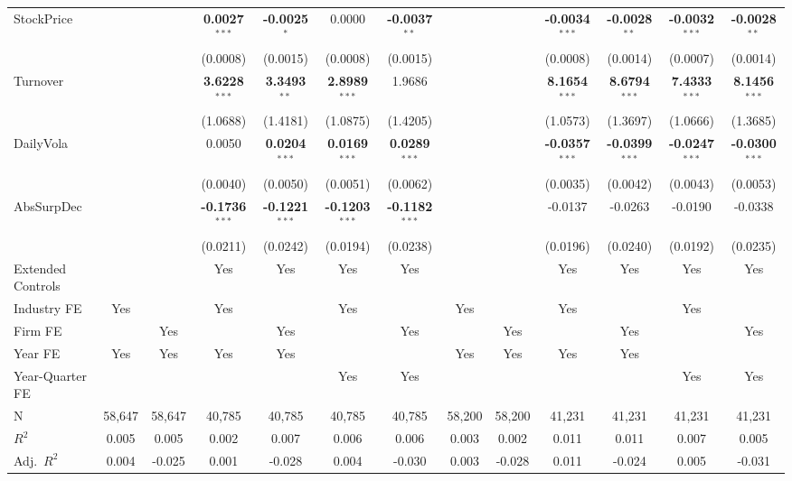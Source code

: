\begin{landscape}
\begin{table}[H]
\begin{tabular}{lcccccccccccc}
StockPrice &  &  & \textbf{0.0027}$^{***}$ & \textbf{-0.0025}$^{*}$ & 0.0000 & \textbf{-0.0037}$^{**}$ &  &  & \textbf{-0.0034}$^{***}$ & \textbf{-0.0028}$^{**}$ & \textbf{-0.0032}$^{***}$ & \textbf{-0.0028}$^{**}$ \\
 &  &  & (0.0008) & (0.0015) & (0.0008) & (0.0015) &  &  & (0.0008) & (0.0014) & (0.0007) & (0.0014) \\
Turnover &  &  & \textbf{3.6228}$^{***}$ & \textbf{3.3493}$^{**}$ & \textbf{2.8989}$^{***}$ & 1.9686 &  &  & \textbf{8.1654}$^{***}$ & \textbf{8.6794}$^{***}$ & \textbf{7.4333}$^{***}$ & \textbf{8.1456}$^{***}$ \\
 &  &  & (1.0688) & (1.4181) & (1.0875) & (1.4205) &  &  & (1.0573) & (1.3697) & (1.0666) & (1.3685) \\
DailyVola &  &  & 0.0050 & \textbf{0.0204}$^{***}$ & \textbf{0.0169}$^{***}$ & \textbf{0.0289}$^{***}$ &  &  & \textbf{-0.0357}$^{***}$ & \textbf{-0.0399}$^{***}$ & \textbf{-0.0247}$^{***}$ & \textbf{-0.0300}$^{***}$ \\
 &  &  & (0.0040) & (0.0050) & (0.0051) & (0.0062) &  &  & (0.0035) & (0.0042) & (0.0043) & (0.0053) \\
AbsSurpDec &  &  & \textbf{-0.1736}$^{***}$ & \textbf{-0.1221}$^{***}$ & \textbf{-0.1203}$^{***}$ & \textbf{-0.1182}$^{***}$ &  &  & -0.0137 & -0.0263 & -0.0190 & -0.0338 \\
 &  &  & (0.0211) & (0.0242) & (0.0194) & (0.0238) &  &  & (0.0196) & (0.0240) & (0.0192) & (0.0235) \\
\midrule
Extended Controls &  &  & Yes & Yes & Yes & Yes &  &  & Yes & Yes & Yes & Yes \\
Industry FE & Yes &  & Yes &  & Yes &  & Yes &  & Yes &  & Yes &  \\
Firm FE &  & Yes &  & Yes &  & Yes &  & Yes &  & Yes &  & Yes \\
Year FE & Yes & Yes & Yes & Yes &  &  & Yes & Yes & Yes & Yes &  &  \\
Year-Quarter FE &  &  &  &  & Yes & Yes &  &  &  &  & Yes & Yes \\
\midrule
N & 58,647 & 58,647 & 40,785 & 40,785 & 40,785 & 40,785 & 58,200 & 58,200 & 41,231 & 41,231 & 41,231 & 41,231 \\
$R^2$ & 0.005 & 0.005 & 0.002 & 0.007 & 0.006 & 0.006 & 0.003 & 0.002 & 0.011 & 0.011 & 0.007 & 0.005 \\
Adj.~$R^2$ & 0.004 & -0.025 & 0.001 & -0.028 & 0.004 & -0.030 & 0.003 & -0.028 & 0.011 & -0.024 & 0.005 & -0.031 \\
\bottomrule
\end{tabular}

\end{table}
\end{landscape}
